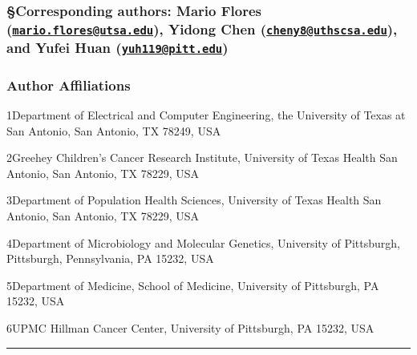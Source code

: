 \documentclass[
]{book}
\begin{document}
\hypertarget{corresponding-authors-mario-flores-mario.floresutsa.edu-yidong-chen-cheny8uthscsa.edu-and-yufei-huan-yuh119pitt.edu}{%
\subsubsection*{\texorpdfstring{\textbf{§Corresponding authors}: Mario Flores (\href{mailto:mario.flores@utsa.edu}{\nolinkurl{mario.flores@utsa.edu}}), Yidong Chen (\href{mailto:cheny8@uthscsa.edu}{\nolinkurl{cheny8@uthscsa.edu}}), and Yufei Huan (\href{mailto:yuh119@pitt.edu}{\nolinkurl{yuh119@pitt.edu}})}{§Corresponding authors: Mario Flores (mario.flores@utsa.edu), Yidong Chen (cheny8@uthscsa.edu), and Yufei Huan (yuh119@pitt.edu)}}\label{corresponding-authors-mario-flores-mario.floresutsa.edu-yidong-chen-cheny8uthscsa.edu-and-yufei-huan-yuh119pitt.edu}}

\hypertarget{author-affiliations}{%
\subsubsection*{\texorpdfstring{\textbf{Author Affiliations}}{Author Affiliations}}\label{author-affiliations}}

1Department of Electrical and Computer Engineering, the University of Texas at San Antonio, San Antonio, TX 78249, USA

2Greehey Children's Cancer Research Institute, University of Texas Health San Antonio, San Antonio, TX 78229, USA

3Department of Population Health Sciences, University of Texas Health San Antonio, San Antonio, TX 78229, USA

4Department of Microbiology and Molecular Genetics, University of Pittsburgh, Pittsburgh, Pennsylvania, PA 15232, USA

5Department of Medicine, School of Medicine, University of Pittsburgh, PA 15232, USA

6UPMC Hillman Cancer Center, University of Pittsburgh, PA 15232, USA

\begin{center}\rule{0.5\linewidth}{0.5pt}\end{center}
\end{document}
